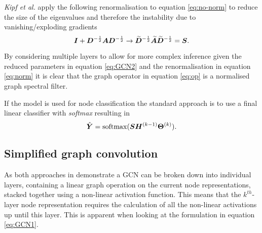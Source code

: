 \textit{Kipf et al.}\cite{kipf2016semi} apply the following renormalisation to equation \ref{eq:no-norm} to reduce the size of the eigenvalues and therefore the instability due to vanishing/exploding gradients
\begin{equation}
    \label{eq:norm}
    {\bm{I}} + {\bm{D}}^{-\frac12}{\bm{A}}{\bm{D}}^{-\frac12} \to \widetilde{{\bm{D}}}^{-\frac12}\widetilde{{\bm{A}}}\widetilde{{\bm{D}}}^{-\frac12} = {\bm{S}}.
\end{equation}

By considering multiple layers to allow for more complex inference given the reduced parameters in equation \ref{eq:GCN2} and the renormalisation in equation \ref{eq:norm} it is clear that the graph operator in equation \ref{eq:op} is a normalised graph spectral filter.






If the model is used for node classification the standard approach is to use a final linear classifier with \emph{softmax} resulting in 
\begin{equation}
    \label{eq:cls}
    \hat{{\bm{Y}}} = \operatorname{softmax}({\bm{S}}{\bm{H}}^{(k-1)}\bm{\Theta}^{(k)}).
\end{equation}

\subsection{Simplified graph convolution}
\label{sec:SGC}



As both approaches in  demonstrate a GCN can be broken down into individual layers, containing a linear graph operation on the current node representations, stacked together using a non-linear activation function.
This means that the $k^{th}$-layer node representation requires the calculation of all the non-linear activations up until this layer.
This is apparent when looking at the formulation in equation \ref{eq:GCN1}.

